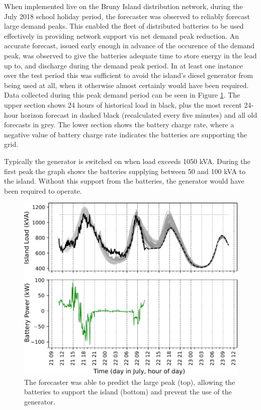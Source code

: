 \documentclass[conference]{IEEEtran}
\begin{document}
When implemented live on the Bruny Island distribution network, during the July 2018 school holiday period, the forecaster was observed to reliably forecast large demand peaks.
This enabled the fleet of distributed batteries to be used effectively in providing network support via net demand peak reduction. An accurate forecast, issued early enough in advance of the occurence of the demand peak, was observed to give the batteries adequate time to store energy in the lead up to, and discharge during the demand peak period. In at least one instance over the test period this was sufficient to avoid the island's diesel generator from being used at all, when it otherwise almost certainly would have been required.
Data collected during this peak demand period can be seen in Figure \ref{fig:bruny_nac}.
The upper section shows 24 hours of historical load in black, plus the most recent 24-hour horizon forecast in dashed black (recalculated every five minutes) and all old forecasts in grey.
The lower section shows the battery charge rate, where a negative value of battery charge rate indicates the batteries are supporting the grid.

Typically the generator is switched on when load exceeds 1050 kVA.
During the first peak the graph shows the batteries supplying between 50 and 100 kVA to the island.
Without this support from the batteries, the generator would have been required to operate.

\begin{figure}[htbp]
	\centerline{\includegraphics[width=.35\textwidth]{images/bruny_nac.pdf}}
	\caption{The forecaster was able to predict the large peak (top), allowing the batteries to support the island (bottom) and prevent the use of the generator.}
	\label{fig:bruny_nac}
\end{figure}
\end{document}
